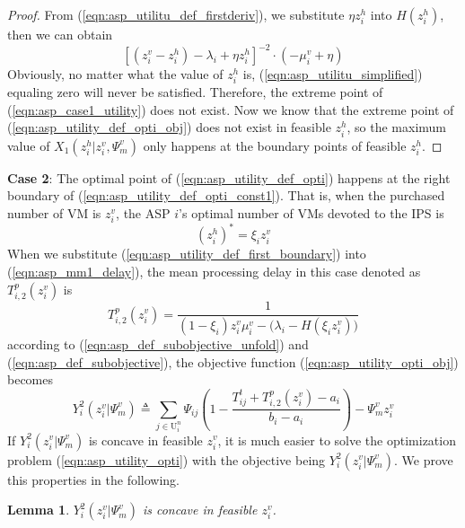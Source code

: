 \documentclass[conference]{IEEEtran}
\newtheorem{lemma}{Lemma}
\begin{document}
\begin{proof}
From (\ref{eqn:asp_utilitu_def_firstderiv}),  we substitute $\eta{z_i^h}$ into $H(z_i^h)$, then we can obtain
\begin{equation} \label{eqn:asp_utilitu_simplified}
[(z_i^v - z_i^h) - \lambda_i + \eta{z_i^h}]^{-2} \cdot (-\mu_i^v + \eta)
\end{equation}
Obviously, no matter what the value of $z_i^h$ is, (\ref{eqn:asp_utilitu_simplified}) equaling zero will never be satisfied. Therefore, the extreme point of (\ref{eqn:asp_case1_utility}) does not exist.
Now we know that the extreme point of (\ref{eqn:asp_utility_def_opti_obj}) does not exist in feasible $z_i^h$, so the maximum value of $X_1(z_i^h|z_i^v,\Psi_m^v)$ only happens at the boundary points of feasible $z_i^h$.
\qedhere
\end{proof}
\textbf{Case 2}: The optimal point of (\ref{eqn:asp_utility_def_opti}) happens at the right boundary of (\ref{eqn:asp_utility_def_opti_const1}). That is, when the purchased number of VM is $z_i^v$, the ASP $i$'s optimal number of VMs devoted to the IPS is
\begin{equation} \label{eqn:asp_utility_def_first_boundary}
(z_i^h)^* = \xi_i z_i^v
\end{equation}
When we substitute (\ref{eqn:asp_utility_def_first_boundary}) into (\ref{eqn:asp_mm1_delay}), the mean processing delay in this case denoted as $T_{i,2}^p(z_i^v)$ is
\begin{equation} \label{eqn:asp_case2_mm1_delay}
T_{i,2}^p(z_i^v) =  \frac{1}{(1-\xi_i)z_i^v\mu_i^v - \big(\lambda_i - H(\xi_iz_i^v)\big)}
\end{equation}
according to (\ref{eqn:asp_def_subobjective_unfold}) and (\ref{eqn:asp_def_subobjective}), the objective function (\ref{eqn:asp_utility_opti_obj}) becomes
\begin{equation} \label{eqn:asp_case2_objective}
Y_i^2(z_i^v|\Psi_m^v) \triangleq \sum_{j \in \mathrm{U}_i^n}\Psi_{ij}(1-\frac{T_{ij}^t + T_{i,2}^p(z_i^v)-a_i}{b_i-a_i}) - \Psi_m^vz_i^v
\end{equation}
If $Y_i^2(z_i^v|\Psi_m^v)$ is concave in feasible $z_i^v$, it is much easier to solve the optimization problem (\ref{eqn:asp_utility_opti}) with the objective being $Y_i^2(z_i^v|\Psi_m^v)$. We prove this properties in the following.
\begin{lemma} \label{lemma:asp_case2_utility_concave}
$Y_i^2(z_i^v|\Psi_m^v)$ is concave in feasible $z_i^v$.
\end{lemma}
\end{document}
